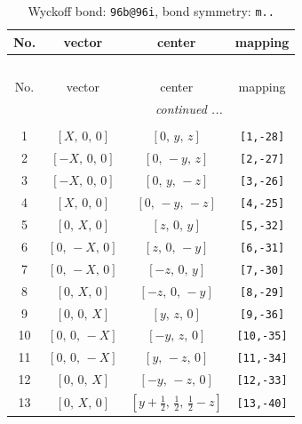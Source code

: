 \documentclass[fleqn,8pt]{jsarticle}
\begin{document}
\begin{longtable}{cccc}
\caption{Wyckoff bond: {\tt 96b@96i}, bond symmetry: {\tt m..}}
 \\
 \hline \hline
No. & vector & center & mapping \\ \hline \endfirsthead

\multicolumn{3}{l}{\tablename\ \thetable{}} \\
 \hline \hline
No. & vector & center & mapping \\ \hline \endhead

 \hline \hline
\multicolumn{3}{r}{\footnotesize\it continued ...} \\ \endfoot

 \hline \hline
\multicolumn{3}{r}{} \\ \endlastfoot

1 & $\left[ X,\, 0,\, 0 \right]$ & $\left[ 0,\, y,\, z \right]$ & {\tt [1,-28]} \\ \hline
2 & $\left[ - X,\, 0,\, 0 \right]$ & $\left[ 0,\, - y,\, z \right]$ & {\tt [2,-27]} \\ \hline
3 & $\left[ - X,\, 0,\, 0 \right]$ & $\left[ 0,\, y,\, - z \right]$ & {\tt [3,-26]} \\ \hline
4 & $\left[ X,\, 0,\, 0 \right]$ & $\left[ 0,\, - y,\, - z \right]$ & {\tt [4,-25]} \\ \hline
5 & $\left[ 0,\, X,\, 0 \right]$ & $\left[ z,\, 0,\, y \right]$ & {\tt [5,-32]} \\ \hline
6 & $\left[ 0,\, - X,\, 0 \right]$ & $\left[ z,\, 0,\, - y \right]$ & {\tt [6,-31]} \\ \hline
7 & $\left[ 0,\, - X,\, 0 \right]$ & $\left[ - z,\, 0,\, y \right]$ & {\tt [7,-30]} \\ \hline
8 & $\left[ 0,\, X,\, 0 \right]$ & $\left[ - z,\, 0,\, - y \right]$ & {\tt [8,-29]} \\ \hline
9 & $\left[ 0,\, 0,\, X \right]$ & $\left[ y,\, z,\, 0 \right]$ & {\tt [9,-36]} \\ \hline
10 & $\left[ 0,\, 0,\, - X \right]$ & $\left[ - y,\, z,\, 0 \right]$ & {\tt [10,-35]} \\ \hline
11 & $\left[ 0,\, 0,\, - X \right]$ & $\left[ y,\, - z,\, 0 \right]$ & {\tt [11,-34]} \\ \hline
12 & $\left[ 0,\, 0,\, X \right]$ & $\left[ - y,\, - z,\, 0 \right]$ & {\tt [12,-33]} \\ \hline
13 & $\left[ 0,\, X,\, 0 \right]$ & $\left[ y + \frac{1}{2},\, \frac{1}{2},\, \frac{1}{2} - z \right]$ & {\tt [13,-40]} \\ \hline

\end{longtable}
\end{document}
